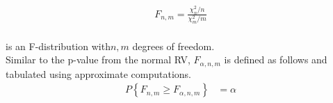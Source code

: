 \begin{align}
	F_{n,m} = \frac{\chi_n^2 / n}{\chi_m^2 / m}
\end{align} \\

is an F-distribution with$ n,m $ degrees of freedom. \\

Similar to the p-value from the normal RV, $ F_{\alpha, n, m} $ is defined as follows and tabulated using approximate computations. \\

\begin{align}
	P \left\{F_{n,m} \geq F_{\alpha, n, m} \right\} &= \alpha \\[1ex]
\end{align} \\

\newpage

